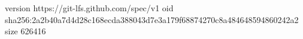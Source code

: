 version https://git-lfs.github.com/spec/v1
oid sha256:2a2b40a7d4d28c168ecda388043d7e3a179f68874270c8a484648594860242a2
size 626416
